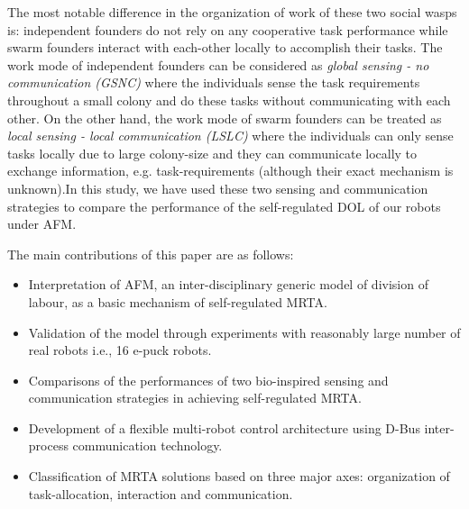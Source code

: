 \documentclass[final,5p,times,twocolumn]{elsarticle}
\begin{document}
The most notable difference in the organization of work of these two social wasps is: independent founders do not rely on any cooperative task performance while swarm founders interact with each-other locally to accomplish their tasks. The work mode of independent founders can be considered as {\em global sensing - no communication (GSNC)} where the individuals sense the task requirements throughout a small colony and do these tasks without communicating with each other. On the other hand, the work mode of swarm founders can be treated as {\em local sensing - local communication (LSLC)} where the individuals can only sense tasks locally due to large colony-size and they can communicate locally to exchange information, e.g. task-requirements (although their exact mechanism is unknown).In this study, we have used these two sensing and communication strategies to compare the performance of the self-regulated DOL of our robots under AFM. 

The main contributions of this paper are as follows:
\begin{itemize}
\item Interpretation of AFM, an inter-disciplinary generic model of division of labour, as a basic mechanism of self-regulated MRTA.
\item Validation of the model through experiments with reasonably large number of real robots i.e., 16 e-puck robots.
\item Comparisons of the performances of two bio-inspired sensing and communication strategies in achieving self-regulated MRTA.
\item Development of a flexible multi-robot control architecture using D-Bus inter-process communication technology.
\item Classification of MRTA solutions based on three major axes: organization of task-allocation, interaction and communication.
\end{itemize}
\end{document}
